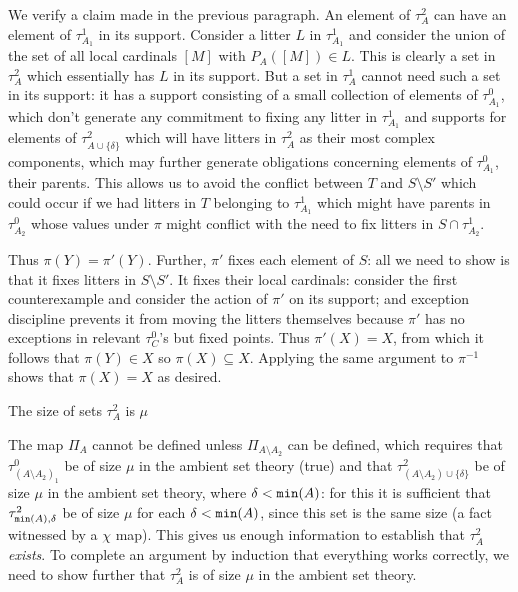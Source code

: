 \documentclass{slides}
\begin{document}
We verify a claim made in the previous paragraph.  An element of $\tau^2_A$
can have an element of $\tau^1_{A_1}$ in its support.  Consider a litter $L$ in $\tau^1_{A_1}$ and consider the union of the set of all local cardinals $[M]$ with $P_A([M]) \in L$.
This is clearly a set in $\tau^2_A$ which essentially has $L$ in its support.  But a set in $\tau^1_A$ cannot need such a set in its support:  it has a support consisting
of a small collection of elements of $\tau^0_{A_1}$, which don't generate any commitment to fixing any litter in $\tau^1_{A_1}$ and supports for elements of
$\tau^2_{A \cup \{\delta\}}$ which will have litters in $\tau^2_A$ as their most complex components, which may further generate obligations concerning elements
of $\tau^0_{A_1}$, their parents.  This allows us to avoid the conflict between $T$ and $S \setminus S'$ which could occur if we had litters in $T$ belonging to $\tau^1_{A_1}$ which might have parents in $\tau^0_{A_2}$ whose values under $\pi$ might conflict with the need to fix
litters in $S \cap \tau^1_{A_2}$.

Thus $\pi(Y) = \pi'(Y)$.  Further,
$\pi'$ fixes each element of $S$:  all we need to show is that it fixes litters in $S \setminus S'$.  It fixes their local cardinals:  consider the first counterexample and consider the action of
$\pi'$ on its support; and exception discipline prevents it from moving the litters themselves because $\pi'$ has no exceptions in relevant $\tau^0_C$'s but fixed points.
Thus $\pi'(X)=X$, from which it follows that $\pi(Y) \in X$ so $\pi(X) \subseteq X$.  Applying the same argument to $\pi^{-1}$ shows that $\pi(X)=X$ as desired.

\begin{slide}

{\Large The size of sets $\tau^2_A$ is $\mu$}

The map $\Pi_A$ cannot be defined unless  $\Pi_{A \setminus A_2}$ can be defined, which requires that $\tau^0_{(A \setminus A_2)_1}$ be of size $\mu$ in the ambient set theory (true)
and that $\tau^2_{(A \setminus A_2) \cup \{\delta\}}$ be of size $\mu$ in the ambient set theory, where $\delta <{\tt min}(A)$:  for this it is sufficient that $\tau^2_{{\tt min}(A),\delta}$ be
of size $\mu$ for each $\delta<{\tt min}(A)$, since this set is the same size (a fact witnessed by a $\chi$ map).  This gives us enough information to establish
that $\tau^2_A$ {\em exists\/}.  To complete an argument by induction that everything works correctly, we need to show further that $\tau^2_A$ is of size $\mu$ in the ambient set theory.

\end{slide}
\end{document}
